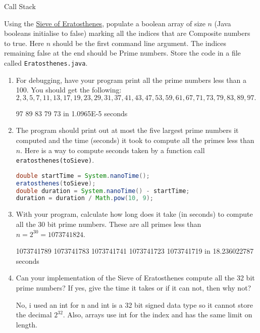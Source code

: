 \documentclass{homework}
\newcommand\callit[1]{Store the code in a file called \texttt{#1}.}
\begin{document}
\begin{sol}
Call Stack
\end{sol}

% 

\question Using the
\href{https://en.wikipedia.org/wiki/Sieve_of_Eratosthenes}{Sieve
  of Eratosthenes}, populate a boolean array of size $n$ (Java
booleans initialise to false) marking all the indices that are
Composite numbers to true. Here $n$ should be the first command
line argument. The indices remaining false at the end should be
Prime numbers. \callit{Eratosthenes.java}

\begin{enumerate}
  \item For debugging, have your program print all the prime numbers less
        than a 100. You should get the following: $ 2, 3, 5, 7, 11, 13,
          17, 19, 23, 29, 31, 37, 41, 43, 47, 53, 59, 61, 67, 71, 73, 79,
          83, 89, 97. $

          \begin{sol}
            97 89 83 79 73 in 1.0965E-5 seconds
          \end{sol}
  \item The program should print out at most the five largest prime
        numbers it computed and the time (seconds) it took to compute all
        the primes less than $n$. Here is a way to compute seconds taken
        by a function call \texttt{eratosthenes(toSieve)}.

        \begin{lstlisting}[language=java]
double startTime = System.nanoTime();
eratosthenes(toSieve);
double duration = System.nanoTime() - startTime;
duration = duration / Math.pow(10, 9);
\end{lstlisting}

  \item With your program, calculate how long does it take (in seconds) to
        compute all the 30 bit prime numbers. These are all primes less
        than $n = 2^{30} = 1073741824$.

        \begin{sol}
          1073741789 1073741783 1073741741 1073741723 1073741719 in 18.236022787 seconds
        \end{sol}

  \item Can your implementation of the Sieve of Eratosthenes compute all
        the 32 bit prime numbers? If yes, give the time it takes or if it
        can not, then why not?

        \begin{sol}
          No, i used an int for n and int is a 32 bit signed data type so it cannot store the decimal $2^{32}$. Also, arrays use int for the index and has the same limit on length.
        \end{sol}
\end{enumerate}
\end{document}
